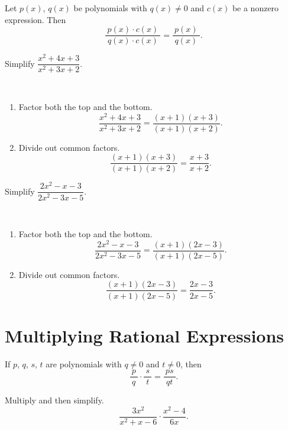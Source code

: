 \documentclass[en,12pt]{elegantbook}
\let\BeginKnitrBlock\begin \let\EndKnitrBlock\end
\begin{document}
Let \(p(x)\), \(q(x)\) be polynomials with \(q(x)\neq 0\) and \(c(x)\) be a nonzero expression. Then
\[
\dfrac{~p(x)\cdot c(x)~}{~q(x)\cdot c(x)~}=\dfrac{~p(x)~}{~q(x)~}.
\]

\BeginKnitrBlock{example}
\protect\hypertarget{exm:unnamed-chunk-41}{}{\label{exm:unnamed-chunk-41} }
Simplify \(\dfrac{x^2+4x+3}{x^2+3x+2}\).
\EndKnitrBlock{example}

\BeginKnitrBlock{solution}
{}\\

\begin{enumerate}
\def\labelenumi{\arabic{enumi}.}
\item
  Factor both the top and the bottom.
  \[
   \dfrac{x^2+4x+3}{x^2+3x+2}=\dfrac{(x+1)(x+3)}{(x+1)(x+2)}.
  \]
\item
  Divide out common factors.
  \[
   \dfrac{(x+1)(x+3)}{(x+1)(x+2)}=\dfrac{x+3}{x+2}.
  \]
\end{enumerate}
\EndKnitrBlock{solution}

\BeginKnitrBlock{example}
\protect\hypertarget{exm:unnamed-chunk-43}{}{\label{exm:unnamed-chunk-43} }
Simplify \(\dfrac{2x^2-x-3}{2x^2-3x-5}\).
\EndKnitrBlock{example}

\BeginKnitrBlock{solution}
{}\\

\begin{enumerate}
\def\labelenumi{\arabic{enumi}.}
\item
  Factor both the top and the bottom.
  \[\dfrac{2x^2-x-3}{2x^2-3x-5}=\dfrac{(x+1)(2x-3)}{(x+1)(2x-5)}.\]
\item
  Divide out common factors.
  \[\dfrac{(x+1)(2x-3)}{(x+1)(2x-5)}=\dfrac{2x-3}{2x-5}.\]
\end{enumerate}
\EndKnitrBlock{solution}

\hypertarget{multiplying-rational-expressions}{%
\section{Multiplying Rational Expressions}\label{multiplying-rational-expressions}}

If \(p\), \(q\), \(s\), \(t\) are polynomials with \(q\neq 0\) and \(t\neq 0\), then
\[
\dfrac{~p~}{~q~}\cdot\dfrac{~s~}{~t~}=\dfrac{~ps~}{~qt~}.
\]

\BeginKnitrBlock{example}
\protect\hypertarget{exm:unnamed-chunk-45}{}{\label{exm:unnamed-chunk-45} }
Multiply and then simplify.
\[\dfrac{3x^2}{x^2+x-6}\cdot\dfrac{x^2-4}{6x}.\]
\EndKnitrBlock{example}
\end{document}
